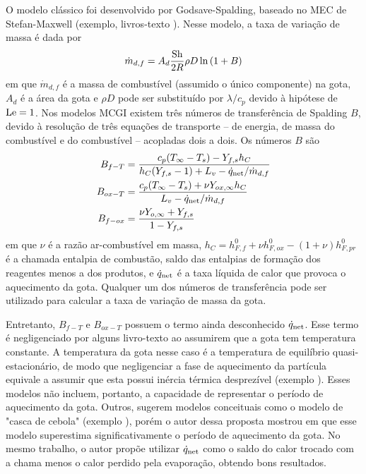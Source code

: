 O modelo clássico foi desenvolvido por Godsave-Spalding, baseado no MEC de Stefan-Maxwell (exemplo, livros-texto \cite{Glassman2008,Law2006,Turns2000}).
Nesse modelo, a taxa de variação de massa é dada por
\begin{equation}
    \dot m_{d,f} = A_d \frac{\mathrm{Sh}}{2R} \rho D \ln{(1 + B)} \label{eq:m_evap_B_M_2}
\end{equation}
em que $\dot m_{d,f}$ é a massa de combustível (assumido o único componente) na gota, $A_d$ é a área da gota e $\rho D$ pode ser substituído por $\lambda/c_p$ devido à hipótese de $\mathrm{Le}=1$.
Nos modelos MCGI existem três números de transferência de Spalding $B$, devido à resolução de três equações de transporte -- de energia, de massa do combustível e do combustível -- acopladas dois a dois.
Os números $B$ são
\begin{align}
    B_{f-T}  &= \frac{c_p(T_\infty - T_s) - Y_{f,s} h_C}{h_C(Y_{f,s} - 1) + L_v - \dot q_{\mathrm{net}}/\dot m_{d,f}} \label{eq:B_fq}\\
    B_{ox-T} &= \frac{c_p(T_\infty - T_s) + \nu Y_{ox,\infty}h_C}{L_v  - \dot q_{\mathrm{net}}/\dot m_{d,f}} \label{eq:B_oq}\\
    B_{f-ox} &= \frac{\nu Y_{o,\infty} + Y_{f,s}}{1 - Y_{f,s}} \label{eq:B_fo}
\end{align}
em que $\nu$ é a razão ar-combustível em massa, $h_C=h^0_{F,f} + \nu h^0_{F,ox} - (1+\nu)h^0_{F,pr}$ é a chamada entalpia de combustão, saldo das entalpias de formação dos reagentes menos a dos produtos, e $\dot q_{\mathrm{net}}$ é a taxa líquida de calor que provoca o aquecimento da gota.
Qualquer um dos números de transferência pode ser utilizado para calcular a taxa de variação de massa da gota.

Entretanto, $B_{f-T}$ e $B_{ox-T}$ possuem o termo ainda desconhecido $\dot q_{\mathrm{net}}$.
Esse termo é negligenciado por alguns livro-texto \cite{Glassman2008,Williams1985} ao assumirem que a gota tem temperatura constante. 
A temperatura da gota nesse caso é a temperatura de equilíbrio quasi-estacionário, de modo que negligenciar a fase de aquecimento da partícula equivale a assumir que esta possui inércia térmica desprezível (exemplo \cite{Turns2000,Glassman2008}). 
Esses modelos não incluem, portanto, a capacidade de representar o  período de aquecimento da gota.
Outros, sugerem modelos conceituais como o modelo de "casca de cebola" (exemplo \cite[p. 385]{Turns2000}), porém o autor dessa proposta mostrou em \cite{HenningsJ2024MT} que esse modelo superestima significativamente o período de aquecimento da gota.
No mesmo trabalho, o autor propõe utilizar $\dot q_{\mathrm{net}}$ como o saldo do calor trocado com a chama menos o calor perdido pela evaporação, obtendo bons resultados.

